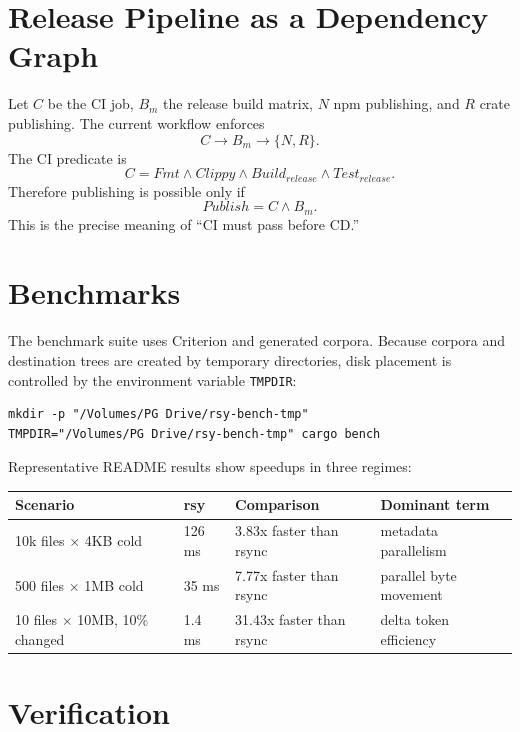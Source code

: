 \documentclass[11pt]{article}
\begin{document}
\section{Release Pipeline as a Dependency Graph}

Let $C$ be the CI job, $B_m$ the release build matrix, $N$ npm publishing, and $R$ crate publishing. The current workflow enforces
\begin{equation}
  C \rightarrow B_m \rightarrow \{N,R\}.
\end{equation}
The CI predicate is
\begin{equation}
  C = Fmt \land Clippy \land Build_{release} \land Test_{release}.
\end{equation}
Therefore publishing is possible only if
\begin{equation}
  Publish = C \land B_m.
\end{equation}
This is the precise meaning of ``CI must pass before CD.''

\section{Benchmarks}

The benchmark suite uses Criterion and generated corpora. Because corpora and destination trees are created by temporary directories, disk placement is controlled by the environment variable \texttt{TMPDIR}:
\begin{verbatim}
mkdir -p "/Volumes/PG Drive/rsy-bench-tmp"
TMPDIR="/Volumes/PG Drive/rsy-bench-tmp" cargo bench
\end{verbatim}

Representative README results show speedups in three regimes:
\begin{center}
\begin{tabular}{llll}
\toprule
Scenario & rsy & Comparison & Dominant term \\
\midrule
10k files $\times$ 4KB cold & 126 ms & 3.83x faster than rsync & metadata parallelism \\
500 files $\times$ 1MB cold & 35 ms & 7.77x faster than rsync & parallel byte movement \\
10 files $\times$ 10MB, 10\% changed & 1.4 ms & 31.43x faster than rsync & delta token efficiency \\
\bottomrule
\end{tabular}
\end{center}

\section{Verification}
\end{document}
